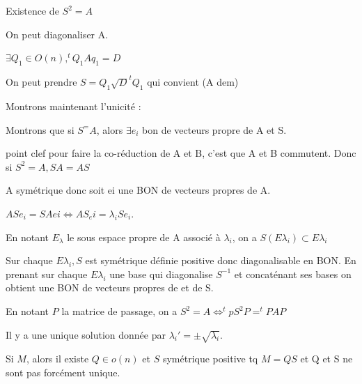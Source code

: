 \documentclass[french]{yLectureNote}
\begin{document}
\begin{myproof}
    Existence de $S^2 =A$

    On peut diagonaliser A.

    $\exists Q_1 \in O(n), ^tQ_1Aq_1 = D$

    On peut prendre $S = Q_1 \sqrt{D}^tQ_1$ qui convient (A dem)

    Montrons maintenant l'unicité :

    Montrons que si $S^=A$, alors $\exists e_i$ bon de vecteurs propre de A et S.

    point clef pour faire la co-réduction de A et B, c'est que A et B commutent.
    Donc si $S^2=A, SA=AS$

    A symétrique donc soit ei une BON de vecteurs propres de A.

    $A S e_i = SA ei \iff A S_ei = \lambda_i S e_i$.

    En notant $E_{\lambda}$ le sous espace propre de A associé à $\lambda_i$, on a $S(E\lambda_i )\subset E\lambda_i$

    Sur chaque $E\lambda_i, S$ est symétrique définie positive donc diagonalisable en BON. En prenant sur chaque $E\lambda_i$ une base qui diagonalise $S^{-1}$ et concaténant ses bases on obtient une BON de vecteurs propres de  et de S.

    En notant $P$ la matrice de passage, on a $S^2=A\iff ^tpS^2P = ^tPAP$

    Il y a une unique solution donnée par $\lambda_i ' = \pm \sqrt{\lambda_i}$.

\end{myproof}
\begin{proposition}[Corollaire]
    Si $M$, alors il existe $Q\in o(n)$ et $S$ symétrique positive tq $M=QS$ et Q et S ne sont pas forcément unique.
\end{proposition}
\end{document}
